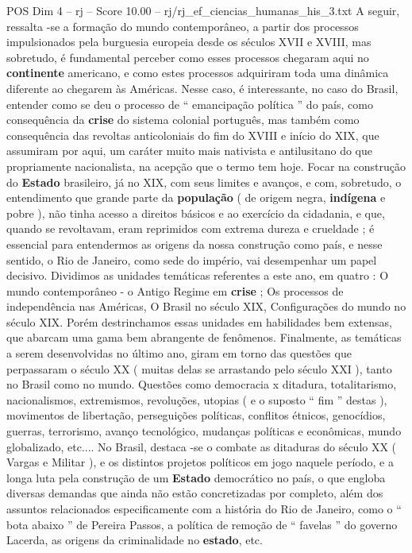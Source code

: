 \begin{textsample}{POS Dim 4 – rj – Score 10.00 – rj/rj\_ef\_ciencias\_humanas\_his\_3.txt}
A seguir, ressalta -se a formação do mundo contemporâneo, a partir dos processos impulsionados pela burguesia europeia desde os séculos XVII e XVIII, mas sobretudo, é fundamental perceber como esses processos chegaram aqui no \textbf{continente} americano, e como estes processos adquiriram toda uma dinâmica diferente ao chegarem às Américas.
Nesse caso, é interessante, no caso do Brasil, entender como se deu o processo de “ emancipação política ” do país, como consequência da \textbf{crise} do sistema colonial português, mas também como consequência das revoltas anticoloniais do fim do XVIII e início do XIX, que assumiram por aqui, um caráter muito mais nativista e antilusitano do que propriamente nacionalista, na acepção que o termo tem hoje.
Focar na construção do \textbf{Estado} brasileiro, já no XIX, com seus limites e avanços, e com, sobretudo, o entendimento que grande parte da \textbf{população} ( de origem negra, \textbf{indígena} e pobre ), não tinha acesso a direitos básicos e ao exercício da cidadania, e que, quando se revoltavam, eram reprimidos com extrema dureza e crueldade ; é essencial para entendermos as origens da nossa construção como país, e nesse sentido, o Rio de Janeiro, como sede do império, vai desempenhar um papel decisivo.
Dividimos as unidades temáticas referentes a este ano, em quatro : O mundo contemporâneo - o Antigo Regime em \textbf{crise} ; Os processos de independência nas Américas, O Brasil no século XIX, Configurações do mundo no século XIX.
Porém destrinchamos essas unidades em habilidades bem extensas, que abarcam uma gama bem abrangente de fenômenos.
Finalmente, as temáticas a serem desenvolvidas no último ano, giram em torno das questões que perpassaram o século XX ( muitas delas se arrastando pelo século XXI ), tanto no Brasil como no mundo.
Questões como democracia x ditadura, totalitarismo, nacionalismos, extremismos, revoluções, utopias ( e o suposto “ fim ” destas ), movimentos de libertação, perseguições políticas, conflitos étnicos, genocídios, guerras, terrorismo, avanço tecnológico, mudanças políticas e econômicas, mundo globalizado, etc....
No Brasil, destaca -se o combate as ditaduras do século XX ( Vargas e Militar ), e os distintos projetos políticos em jogo naquele período, e a longa luta pela construção de um \textbf{Estado} democrático no país, o que engloba diversas demandas que ainda não estão concretizadas por completo, além dos assuntos relacionados especificamente com a história do Rio de Janeiro, como o “ bota abaixo ” de Pereira Passos, a política de remoção de “ favelas ” do governo Lacerda, as origens da criminalidade no \textbf{estado}, etc.

\end{textsample}
